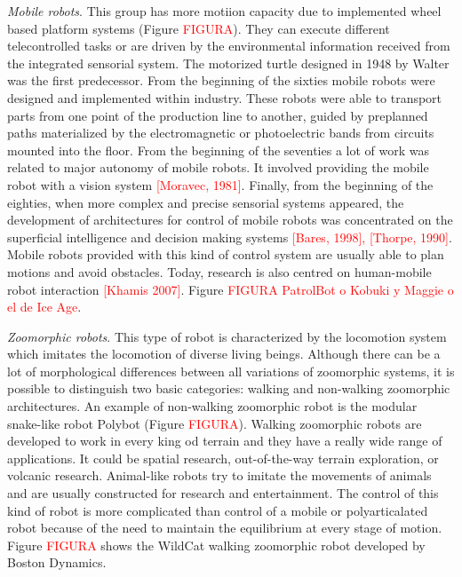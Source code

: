 \textit{Mobile robots}. This group has more motiion capacity due to implemented wheel based platform systems (Figure \textcolor{red}{FIGURA}). They can execute different telecontrolled tasks or are driven by the environmental information received from the integrated sensorial system. The motorized turtle designed in 1948 by Walter was the first predecessor. From the beginning of the sixties mobile robots were designed and implemented within industry. These robots were able to transport parts from one point of the production line to another, guided by preplanned paths materialized by the electromagnetic or photoelectric bands from circuits mounted into the floor. From the beginning of the seventies a lot of work was related to major autonomy of mobile robots. It involved providing the mobile robot with a vision system \textcolor{red}{[Moravec, 1981]}. Finally, from the beginning of the eighties, when more complex and precise sensorial systems appeared, the development of architectures for control of mobile robots was concentrated on the superficial intelligence and decision making systems \textcolor{red}{[Bares, 1998], [Thorpe, 1990]}. Mobile robots provided with this kind of control system are usually able to plan motions and avoid obstacles. Today, research is also centred on human-mobile robot interaction \textcolor{red}{[Khamis 2007]}. Figure \textcolor{red}{FIGURA PatrolBot o Kobuki y Maggie o el de Ice Age}.

\textit{Zoomorphic robots}. This type of robot is characterized by the locomotion system which imitates the locomotion of diverse living beings. Although there can be a lot of morphological differences between all variations of zoomorphic systems, it is possible to distinguish two basic categories: walking and non-walking zoomorphic architectures. An example of non-walking zoomorphic robot is the modular snake-like robot Polybot (Figure \textcolor{red}{FIGURA}). Walking zoomorphic robots are developed to work in every king od terrain and they have a really wide range of applications. It could be spatial research, out-of-the-way terrain exploration, or volcanic research. Animal-like robots try to imitate the movements of animals and are usually constructed for research and entertainment. The control of this kind of robot is more complicated than control of a mobile or polyarticalated robot because of the need to maintain the equilibrium at every stage of motion. Figure \textcolor{red}{FIGURA} shows the WildCat walking zoomorphic robot developed by Boston Dynamics.

